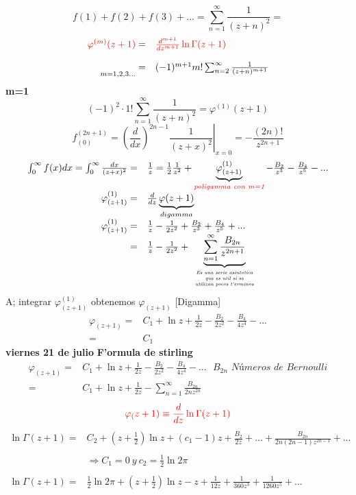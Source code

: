 \documentclass{article}
\theoremstyle{definition}
\begin{document}
\[f(1)+f(2)+f(3)+...=\sum^{\infty}_{n=1}\frac{1}{(z+n)^2}=\]
\[
\begin{array}{rl}
	\textcolor{red}{\varphi^{(m)}(z+1)}=&\textcolor{red}{\frac{d^{m+1}}{dz^{m+1}}\ln \Gamma (z+1)}\\
	\\
	\underset{m=1,2,3...}{ }=& (-1)^{m+1}m!\sum^{\infty}_{n=2}\frac{1}{(z+n)^{m+1}}
\end{array}
\]
\textbf{m=1}
\[(-1)^2\cdot 1!\sum^{\infty}_{n=1}\frac{1}{(z+n)^2}=\varphi^{(1)}(z+1)\]
\[f^{(2n+1)}_{(0)}=\left.\left(\frac{d}{dx}\right)^{2n-1}\frac{1}{(z+x)^2}\right|_{x=0}=-\frac{(2n)!}{z^{2n+1}}\]
\[
\begin{array}{rl}
	\int^{\infty}_0f(x)dx=\int^{\infty}_0\frac{dx}{(z+x)^2}=&\frac{1}{z}=\frac{1}{2}\frac{1}{z^2}+\underbrace{\varphi ^{(1)}_{(z+1)}}_{\textcolor{red}{\textit{poligamma con m=1}}}-\frac{B_2}{z^3}-\frac{B_4}{z^5}-...\\
	\varphi ^{(1)}_{(z+1)}=& \frac{d}{dz}\underbrace{\varphi (z+1)}_{digamma}\\
	\varphi ^{(1)}_{(z+1)}=&\frac{1}{z}-\frac{1}{2z^2}+\frac{B_2}{z^3}+\frac{B_4}{z^5}+...\\
	=& \frac{1}{z}-\frac{1}{2z^2}+\underbrace{\sum^{\infty}_{n=1}\frac{B_{2n}}{z^{2n+1}}}_{
	\begin{tiny}
	\begin{array}{c}
		\textit{Es una serie asintotica}\\
		\textit{que es util si se}\\
		\textit{utilizan pocos t'erminos}
	\end{array}		
	\end{tiny}			
	}
\end{array}\]
A; integrar $\varphi ^{(1)}_{(z+1)}$ obtenemos $\varphi _{(z+1)}$ [Digamma]
\[
\begin{array}{rl}
	\varphi_{(z+1)}=& C_1+\ln z+\frac{1}{2z}-\frac{B_2}{2z^2}-\frac{B_4}{4z^4}-...\\
	=& C_1
\end{array}
\]
\newpage
\textbf{viernes 21 de julio}
\textbf{F'ormula de stirling}
\[
\begin{array}{rl}
	\varphi_{(z+1)}=& C_1 +\ln z+ \frac{1}{2z}-\frac{B_2}{2z^2}-\frac{B_4}{4z^4}-...\ \ \ B_{2n} \textit{ Números de Bernoulli}\\
	=& C_1 +\ln z+ \frac{1}{2z}-\sum^{\infty}_{n=1}\frac{B_{2n}}{2nz^{2n}}
\end{array}
\]
\[\textcolor{red}{\varphi_(z+1)\equiv \frac{d}{dz} \ln \Gamma (z+1)}\]
\[
\begin{array}{rl}
	\ln \Gamma (z+1) =& C_2 +\left(z+\frac{1}{2}\right) \ln z + (c_1-1)z+\frac{B_2}{2z}+...+ \frac{B_{2n}}{2n(2n-1)z^{2n-1}}+...\\
	\\
	&\Rightarrow C_1=0\ y \ c_2=\frac{1}{2}\ln 2\pi\\
	\\
	\ln \Gamma (z+1) =&\frac{1}{2} \ln 2\pi + \left(z+\frac{1}{2}\right) \ln z -z+\frac{1}{12z}+\frac{1}{360z^3}+\frac{1}{1260z^5}+...\\
\end{array}
\]
\end{document}
